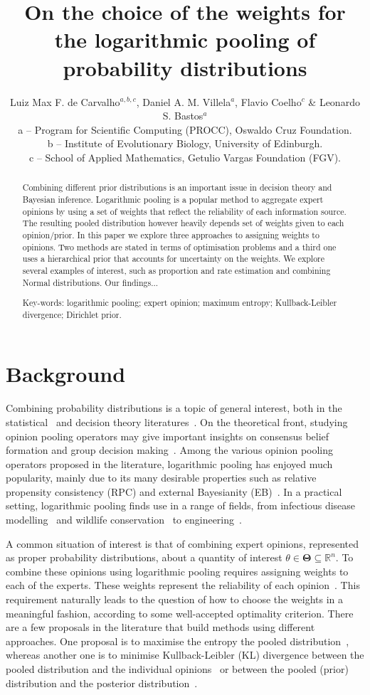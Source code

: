 \documentclass[a4paper, notitlepage, 10pt]{article}
\title{\vspace{-9ex}\centering \bf On the choice of the weights for the logarithmic pooling of probability distributions}
\author{
Luiz Max F. de Carvalho$^{a,b,c}$, Daniel A. M. Villela$^a$, Flavio Coelho$^c$ \& Leonardo S. Bastos$^a$ \\
a -- Program for Scientific Computing (PROCC), Oswaldo Cruz Foundation. \\
b -- Institute of Evolutionary Biology, University of Edinburgh.\\
c -- School of Applied Mathematics, Getulio Vargas Foundation (FGV).
}
\begin{document}
\maketitle

\begin{abstract}
Combining different prior distributions is an important issue in decision theory and Bayesian inference.
Logarithmic pooling is a popular method to aggregate expert opinions by using a set of weights that reflect the reliability of each information source.
The resulting pooled distribution however heavily depends set of weights given to each opinion/prior.
In this paper we explore three approaches to assigning weights to opinions.
Two methods are stated in terms of optimisation problems and a third one uses a hierarchical prior that accounts for uncertainty on the weights. 
We explore several examples of interest, such as proportion and rate estimation and combining Normal distributions.
Our findings...

Key-words: logarithmic pooling; expert opinion; maximum entropy; Kullback-Leibler divergence; Dirichlet prior. 
\end{abstract}

\section*{Background}

Combining probability distributions is a topic of general interest, both in the statistical~\citep{west1984, genest1986A, genest1986B} and decision theory literatures~\citep{genest1984}.
On the theoretical front, studying opinion pooling operators may give important insights on consensus belief formation and group decision making~\citep{genest1986B}.
Among the various opinion pooling operators proposed in the literature, logarithmic pooling has enjoyed much popularity, mainly due to its many desirable properties such as relative propensity consistency (RPC) and external Bayesianity (EB)~\citep{genest1986A}. 
In a practical setting, logarithmic pooling finds use in a range of fields, from infectious disease modelling~\citep{Coelho2009} and wildlife conservation~\citep{poole2000} to engineering~\citep{lind1988, savchuk1994}.

A common situation of interest is that of combining expert opinions, represented as proper probability distributions, about a quantity of interest $\theta \in \mathbf{\Theta} \subseteq \mathbb{R}^n$.
To combine these opinions using logarithmic pooling requires assigning weights to each of the experts.
These weights represent the reliability of each opinion~\citep{genest1984}.
This requirement naturally leads to the question of how to choose the weights in a meaningful fashion, according to some well-accepted optimality criterion.
There are a few proposals in the literature that build methods using different approaches.
One proposal is to maximise the entropy the pooled distribution~\citep{myung1996}, whereas another one is to minimise Kullback-Leibler (KL) divergence between the pooled distribution and the individual opinions~\citep{abbas2009} or between the pooled (prior) distribution and the posterior distribution~\citep{rufo2012A,rufo2012B}.
\end{document}
